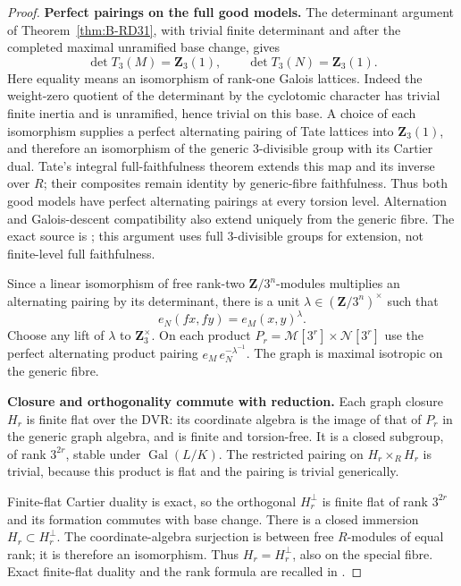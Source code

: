 \begin{proof}
\par\smallskip\noindent\textbf{Perfect pairings on the full good models.}
The determinant argument of Theorem~\ref{thm:B-RD31}, with
trivial finite determinant and after the completed maximal
unramified base change, gives
\[
             \det T_3(M)=\mathbf Z_3(1),\qquad
             \det T_3(N)=\mathbf Z_3(1).
\]
Here equality means an isomorphism of rank-one Galois lattices.
Indeed the weight-zero quotient of the determinant by the
cyclotomic character has trivial finite inertia and is
unramified, hence trivial on this base. A choice of each
isomorphism supplies a perfect alternating pairing of Tate
lattices into $\mathbf Z_3(1)$, and therefore an isomorphism
of the generic $3$-divisible group with its Cartier dual.
Tate's integral full-faithfulness theorem extends this map
and its inverse over $R$; their composites remain identity
by generic-fibre faithfulness. Thus both good models have
perfect alternating pairings at every torsion level.
Alternation and Galois-descent compatibility also extend
uniquely from the generic fibre. The exact source is
\cite[Theorem~4 and Corollaries~1--2, printed p.~181]
{Tate1967PDivisible}; this argument uses full $3$-divisible
groups for extension, not finite-level full faithfulness.

Since a linear isomorphism of free rank-two
$\mathbf Z/3^n$-modules multiplies an alternating pairing by
its determinant, there is a unit
$\lambda\in(\mathbf Z/3^n)^\times$ such that
\[
            e_N(fx,fy)=e_M(x,y)^\lambda.
\]
Choose any lift of $\lambda$ to $\mathbf Z_3^\times$.
On each product $P_r=\mathcal M[3^r]\times\mathcal N[3^r]$
use the perfect alternating product pairing
$e_M\,e_N^{-\lambda^{-1}}$. The graph is maximal isotropic
on the generic fibre.

\par\smallskip\noindent\textbf{Closure and orthogonality commute with reduction.}
Each graph closure $H_r$ is finite flat over the DVR:
its coordinate algebra is the image of that of $P_r$ in
the generic graph algebra, and is finite and torsion-free.
It is a closed subgroup, of rank $3^{2r}$, stable under
$\operatorname{Gal}(L/K)$. The restricted pairing on
$H_r\times_RH_r$ is trivial, because this product is flat
and the pairing is trivial generically.

Finite-flat Cartier duality is exact, so the orthogonal
$H_r^\perp$ is finite flat of rank $3^{2r}$ and its formation
commutes with base change. There is a closed immersion
$H_r\subset H_r^\perp$. The coordinate-algebra surjection
is between free $R$-modules of equal rank; it is therefore
an isomorphism. Thus $H_r=H_r^\perp$, also on the special
fibre. Exact finite-flat duality and the rank formula are
recalled in \cite[\S1.2--1.3, printed pp.~159--160]
{Tate1967PDivisible}.


\end{proof}
